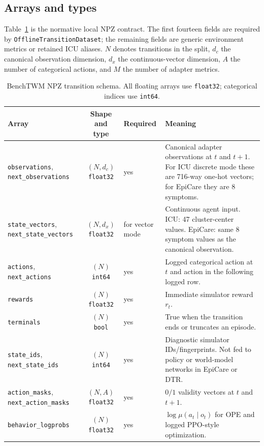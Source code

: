 \documentclass[10pt,twocolumn]{article}
\newcommand{\code}[1]{\texttt{#1}}
\newcommand{\behavior}{\mu}
\begin{document}
\subsection{Arrays and types}

Table~\ref{tab:schema} is the normative local NPZ contract. The first fourteen fields are required by \code{OfflineTransitionDataset}; the remaining fields are generic environment metrics or retained ICU aliases. $N$ denotes transitions in the split, $d_c$ the canonical observation dimension, $d_x$ the continuous-vector dimension, $A$ the number of categorical actions, and $M$ the number of adapter metrics.

\begin{table}[t]
\centering
\caption{BenchTWM NPZ transition schema. All floating arrays use \code{float32}; categorical indices use \code{int64}.}
\label{tab:schema}
\small
\begin{tabularx}{\textwidth}{lclX}
\toprule
Array & Shape and type & Required & Meaning \\
\midrule
\code{observations}, \code{next\_observations} & $(N,d_c)$ \code{float32} & yes & Canonical adapter observations at $t$ and $t+1$. For ICU discrete mode these are 716-way one-hot vectors; for EpiCare they are 8 symptoms. \\
\code{state\_vectors}, \code{next\_state\_vectors} & $(N,d_x)$ \code{float32} & for vector mode & Continuous agent input. ICU: 47 cluster-center values. EpiCare: same 8 symptom values as the canonical observation. \\
\code{actions}, \code{next\_actions} & $(N)$ \code{int64} & yes & Logged categorical action at $t$ and action in the following logged row. \\
\code{rewards} & $(N)$ \code{float32} & yes & Immediate simulator reward $r_t$. \\
\code{terminals} & $(N)$ \code{bool} & yes & True when the transition ends or truncates an episode. \\
\code{state\_ids}, \code{next\_state\_ids} & $(N)$ \code{int64} & yes & Diagnostic simulator IDs/fingerprints. Not fed to policy or world-model networks in EpiCare or DTR. \\
\code{action\_masks}, \code{next\_action\_masks} & $(N,A)$ \code{float32} & yes & $0/1$ validity vectors at $t$ and $t+1$. \\
\code{behavior\_logprobs} & $(N)$ \code{float32} & yes & $\log\behavior(a_t\mid o_t)$ for OPE and logged PPO-style optimization. \\

\end{tabularx}
\end{table}
\end{document}
